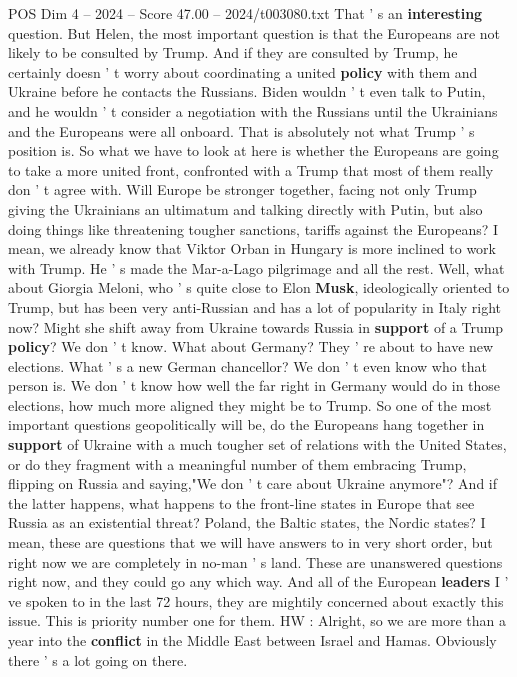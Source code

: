\begin{textsample}{POS Dim 4 – 2024 – Score 47.00 – 2024/t003080.txt}
That ' s an \textbf{interesting} question.
But Helen, the most important question is that the Europeans are not likely to be consulted by Trump.
And if they are consulted by Trump, he certainly doesn ' t worry about coordinating a united \textbf{policy} with them and Ukraine before he contacts the Russians.
Biden wouldn ' t even talk to Putin, and he wouldn ' t consider a negotiation with the Russians until the Ukrainians and the Europeans were all onboard.
That is absolutely not what Trump ' s position is.
So what we have to look at here is whether the Europeans are going to take a more united front, confronted with a Trump that most of them really don ' t agree with.
Will Europe be stronger together, facing not only Trump giving the Ukrainians an ultimatum and talking directly with Putin, but also doing things like threatening tougher sanctions, tariffs against the Europeans?
I mean, we already know that Viktor Orban in Hungary is more inclined to work with Trump.
He ' s made the Mar-a-Lago pilgrimage and all the rest.
Well, what about Giorgia Meloni, who ' s quite close to Elon \textbf{Musk}, ideologically oriented to Trump, but has been very anti-Russian and has a lot of popularity in Italy right now?
Might she shift away from Ukraine towards Russia in \textbf{support} of a Trump \textbf{policy}?
We don ' t know.
What about Germany?
They ' re about to have new elections.
What ' s a new German chancellor?
We don ' t even know who that person is.
We don ' t know how well the far right in Germany would do in those elections, how much more aligned they might be to Trump.
So one of the most important questions geopolitically will be, do the Europeans hang together in \textbf{support} of Ukraine with a much tougher set of relations with the United States, or do they fragment with a meaningful number of them embracing Trump, flipping on Russia and saying,"We don ' t care about Ukraine anymore"?
And if the latter happens, what happens to the front-line states in Europe that see Russia as an existential threat?
Poland, the Baltic states, the Nordic states?
I mean, these are questions that we will have answers to in very short order, but right now we are completely in no-man ' s land.
These are unanswered questions right now, and they could go any which way.
And all of the European \textbf{leaders} I ' ve spoken to in the last 72 hours, they are mightily concerned about exactly this issue.
This is priority number one for them.
HW : Alright, so we are more than a year into the \textbf{conflict} in the Middle East between Israel and Hamas.
Obviously there ' s a lot going on there.

\end{textsample}
